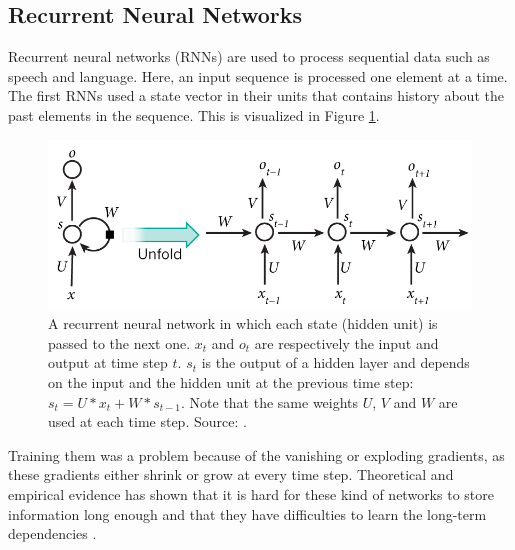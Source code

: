 \documentclass[a4paper]{article}
\begin{document}
\subsection{Recurrent Neural Networks}
Recurrent neural networks (RNNs) are used to process sequential data such as speech and language. Here, an input sequence is processed one element at a time. The first RNNs used a state vector in their units that contains history about the past elements in the sequence. This is visualized in Figure \ref{fig:rnnunrolled}.
\begin{figure}[H]
\centering
\includegraphics[width=0.8\linewidth]{images/RNN-unrolled.jpg} %
\caption{A recurrent neural network in which each state (hidden unit) is passed to the next one. $x_t$ and $o_t$ are respectively the input and output at time step $t$. $s_t$ is the output of a hidden layer and depends on the input and the hidden unit at the previous time step: $s_t = U*x_t + W*s_{t-1}$. Note that the same weights $U$, $V$ and $W$ are used at each time step. Source: \cite{LeCun2015DeepLearning}.}
\label{fig:rnnunrolled}
\end{figure}

Training them was a problem because of the vanishing or exploding gradients, as these gradients either shrink or grow at every time step. Theoretical and empirical evidence has shown that it is hard for these kind of networks to store information long enough and that they have difficulties to learn the long-term dependencies \citep{bengio1994learning}.\\ %
\end{document}
